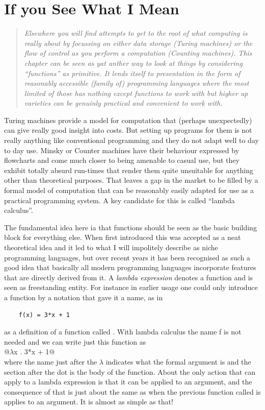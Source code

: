 \section{If you See What I Mean}
\begin{quotation}\textit{
Elsewhere you will find attempts to get to the root of what computing is
really about by focussing on either data storage (Turing machines) or
the flow of control as you perform a computation (Counting machines). This
chapter can be seen as yat anther way to look at things by considering
``functions'' as primitive. It lends itself to presentation in the form
of reasonably accessible (family of) programming languages where the
most limited of those has nothing except functions to work with but
higher up varieties can be genuinly practical and convenient to work with.
}\end{quotation}
Turing machines provide a model for computation that (perhaps unexpectedly)
can give really good insight into costs. But setting up programs for them
is not really anything like conventional programming and they do not
adapt well to day to day use. Minsky or Counter machines have their
behaviour expressed by flowcharts and come much closer to being amenable
to casual use, but they exhibit totally absurd run-times that render them
quite unsuitable for anything other than theoretical purposes. That leaves
a gap in the market to be filled by a formal model of computation that can
be reasonably easily adapted for use as a practical programming system. A
key candidate for this is called ``lambda calculus''.

The fundamental idea here ia that functions should be seen as the basic
building block for everything else. When first introduced this was accepted
as a neat theoretical idea and it led to what I will impolitely describe
as niche programming languages, but over recent years it has been recognised
as such a good idea that basically all modern programming languages
incorporate features that are directly derived from it. A {\em lambda
expression} denotes a function and is seen as freestanding entity. For
instance in earlier usage one could only introduce a function by a notation
that gave it a name, as in
\begin{verbatim}
    f(x) = 3*x + 1
\end{verbatim}
as a definition of a function called \verb@f@. With lambda calculus the
name f is not needed and we can write just this function as \\
\verb@    @$\lambda$\verb@ x . 3*x + 1@\\
where the name just after the $\lambda$ indicates what the formal argument is
and the section after the dot is the body of the function. About the only
action that can apply to a lambda expression is that it can be applied to
an argument, and the consequence of that is just about the same as when the
previous function called \verb@f@ is applies to an argument. It is almost
as simple as that!

